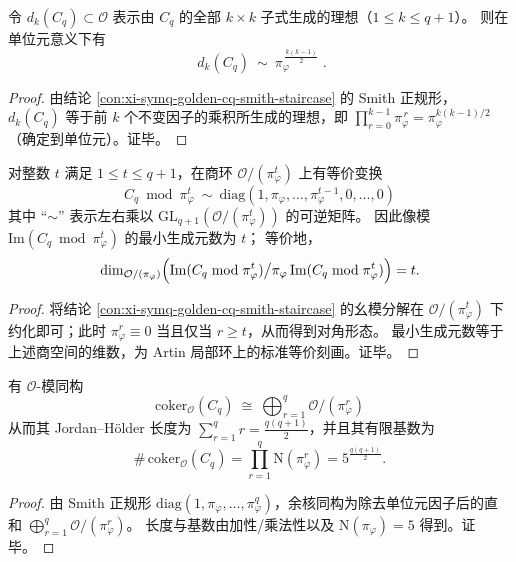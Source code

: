 \begin{corollary}\label{cor:xi-symq-golden-cq-determinantal-divisors}
令 \(d_k(C_q)\subset\mathcal O\) 表示由 \(C_q\) 的全部 \(k\times k\) 子式生成的理想（\(1\le k\le q+1\)）。
则在单位元意义下有
\[
\boxed{\;
d_k(C_q)\ \sim\ \pi_\varphi^{\,\frac{k(k-1)}{2}}\; }.
\]
\end{corollary}
\begin{proof}
由结论 \ref{con:xi-symq-golden-cq-smith-staircase} 的 Smith 正规形，
\(d_k(C_q)\) 等于前 \(k\) 个不变因子的乘积所生成的理想，即
\(
\prod_{r=0}^{k-1}\pi_\varphi^{\,r}=\pi_\varphi^{k(k-1)/2}
\)（确定到单位元）。证毕。
\end{proof}

\begin{corollary}\label{cor:xi-symq-golden-cq-mod-pi-power-staircase}
对整数 \(t\) 满足 \(1\le t\le q+1\)，在商环 \(\mathcal O/(\pi_\varphi^t)\) 上有等价变换
\[
\boxed{\;
C_q\bmod \pi_\varphi^t
\ \sim\
\mathrm{diag}(1,\pi_\varphi,\dots,\pi_\varphi^{t-1},0,\dots,0)\;}
\]
其中 “\(\sim\)” 表示左右乘以 \(\mathrm{GL}_{q+1}(\mathcal O/(\pi_\varphi^t))\) 的可逆矩阵。
因此像模 \(\mathrm{Im}(C_q\bmod \pi_\varphi^t)\) 的最小生成元数为 \(t\)；
等价地，
\[
\dim_{\mathcal O/(\pi_\varphi)}\Bigl(\mathrm{Im}(C_q\bmod \pi_\varphi^t)\big/\pi_\varphi\,\mathrm{Im}(C_q\bmod \pi_\varphi^t)\Bigr)=t.
\]
\end{corollary}
\begin{proof}
将结论 \ref{con:xi-symq-golden-cq-smith-staircase} 的幺模分解在 \(\mathcal O/(\pi_\varphi^t)\) 下约化即可；此时 \(\pi_\varphi^{r}\equiv 0\) 当且仅当 \(r\ge t\)，从而得到对角形态。
最小生成元数等于上述商空间的维数，为 Artin 局部环上的标准等价刻画。证毕。
\end{proof}

\begin{corollary}\label{cor:xi-symq-golden-cq-cokernel-structure}
有 \(\mathcal O\)-模同构
\[
\boxed{\;
\mathrm{coker}_{\mathcal O}(C_q)\ \cong\ \bigoplus_{r=1}^{q}\mathcal O/(\pi_\varphi^{r})\;}
\]
从而其 Jordan--H\"older 长度为 \(\sum_{r=1}^{q}r=\frac{q(q+1)}{2}\)，并且其有限基数为
\[
\boxed{\;
\#\,\mathrm{coker}_{\mathcal O}(C_q)=\prod_{r=1}^{q}\mathrm N(\pi_\varphi^{r})=5^{\frac{q(q+1)}{2}}.\;}
\]
\end{corollary}
\begin{proof}
由 Smith 正规形 \(\mathrm{diag}(1,\pi_\varphi,\dots,\pi_\varphi^{q})\)，余核同构为除去单位元因子后的直和 \(\bigoplus_{r=1}^q\mathcal O/(\pi_\varphi^r)\)。
长度与基数由加性/乘法性以及 \(\mathrm N(\pi_\varphi)=5\) 得到。证毕。
\end{proof}


